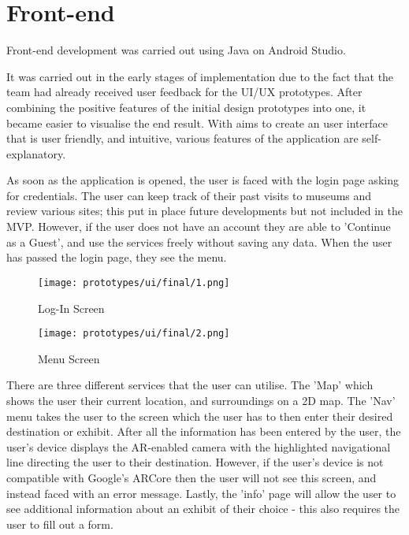 \section{Front-end}
Front-end development was carried out using Java on Android Studio. 

It was carried out in the early stages of implementation due to the fact that the team had already received user feedback for the UI/UX prototypes. After combining the positive features of the initial design prototypes into one, it became easier to visualise the end result. With aims to create an user interface that is user friendly, and intuitive, various features of the application are self-explanatory. 

As soon as the application is opened, the user is faced with the login page asking for credentials. The user can keep track of their past visits to museums and review various sites; this put in place future developments but not included in the MVP. However, if the user does not have an account they are able to 'Continue as a Guest', and use the services freely without saving any data. When the user has passed the login page, they see the menu.

\begin{figure}[H]
    \centering
    \begin{minipage}[b]{0.4\textwidth}
        \texttt{[image: prototypes/ui/final/1.png]}
        \caption{Log-In Screen}
        \label{fig:loginscreen}
    \end{minipage}
    \qquad
    \begin{minipage}[b]{0.4\textwidth}
        \texttt{[image: prototypes/ui/final/2.png]}
        \caption{Menu Screen}
        \label{fig:menuscreen}
    \end{minipage}
\end{figure}

There are three different services that the user can utilise. The 'Map' which shows the user their current location, and surroundings on a 2D map. The 'Nav' menu takes the user to the screen which the user has to then enter their desired destination or exhibit. After all the information has been entered by the user, the user's device displays the AR-enabled camera with the highlighted navigational line directing the user to their destination. However, if the user's device is not compatible with Google's ARCore then the user will not see this screen, and instead faced with an error message. Lastly, the 'info' page will allow the user to see additional information about an exhibit of their choice - this also requires the user to fill out a form.

